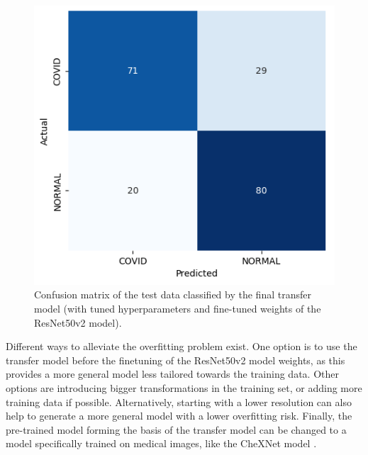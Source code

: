 \documentclass[conference]{IEEEtran}
\begin{document}
\begin{figure}[h] \centering \includegraphics[width=0.9\columnwidth]{fig_task3_confusionmatrix.png} \caption{Confusion matrix of the test data classified by the final transfer model (with tuned hyperparameters and fine-tuned weights of the ResNet50v2 model).} \label{fig:task3_confusionmatrix} 
\end{figure}

Different ways to alleviate the overfitting problem exist. One option is to use the transfer model before the finetuning of the ResNet50v2 model weights, as this provides a more general model less tailored towards the training data. Other options are introducing bigger transformations in the training set, or adding more training data if possible. Alternatively, starting with a lower resolution can also help to generate a more general model with a lower overfitting risk. Finally, the pre-trained model forming the basis of the transfer model can be changed to a model specifically trained on medical images, like the CheXNet model \cite{CHEXNET}.



\end{document}
